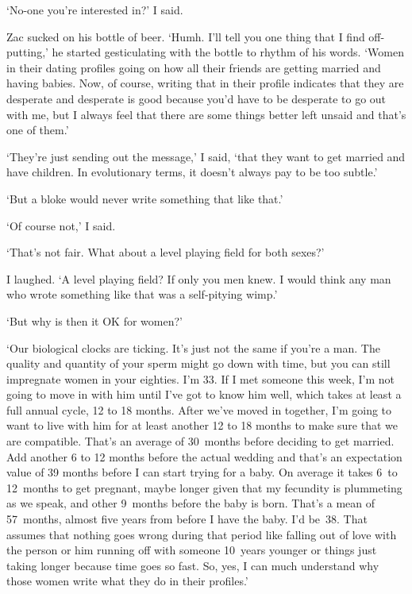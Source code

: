 `No-one you're interested in?' I said.

Zac sucked on his bottle of beer. `Humh. I'll tell you one thing
that I find off-putting,' he started gesticulating with the bottle
to rhythm of his words. `Women in their dating profiles going on how
all their friends are getting married and having babies. Now, of
course, writing that in their profile indicates that they are
desperate and desperate is good because you'd have to be desperate
to go out with me, but I always feel that there are some things
better left unsaid and that's one of them.'

`They're just sending out the message,' I said, `that they want to
get married and have children. In evolutionary terms, it doesn't
always pay to be too subtle.'

`But a bloke would never write something that like that.'

`Of course not,' I said.

`That's not fair. What about a level playing field for both sexes?'

I laughed. `A level playing field? If only you men knew. I would think
any man who wrote something like that was a self-pitying wimp.'

`But why is then it OK for women?'

`Our biological clocks are ticking. It's just not the same if you're
a man. The quality and quantity of your sperm might go down with
time, but you can still impregnate women in your eighties. I'm 33.
If I met someone this week, I'm not going to move in with him until
I've got to know him well, which takes at least a full annual cycle,
12 to 18 months. After we've moved in together, I'm going to want to
live with him for at least another 12 to 18 months to make sure that
we are compatible. That's an average of 30~months before deciding to
get married. Add another 6 to 12 months before the actual wedding
and that's an expectation value of 39 months before I can start
trying for a baby. On average it takes 6~to 12~months to get
pregnant, maybe longer given that my fecundity is plummeting as we
speak, and other 9~months before the baby is born. That's a mean of
57~months, almost five years from before I have the baby. I'd
be~38. That assumes that nothing goes wrong during that period like
falling out of love with the person or him running off with someone
10~years younger or things just taking longer because time goes so fast. So, yes, I can much understand why those women
write what they do in their profiles.'

